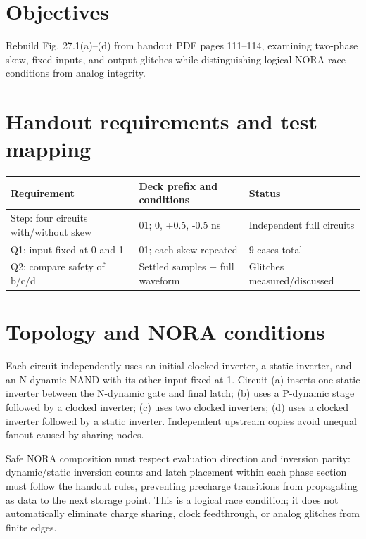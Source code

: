 \section{Objectives}

Rebuild Fig. 27.1(a)--(d) from handout PDF pages 111--114, examining two-phase skew, fixed inputs, and output glitches while distinguishing logical NORA race conditions from analog integrity.

\section{Handout requirements and test mapping}

\begin{center}
\small
\setlength{\tabcolsep}{4pt}
\begin{tabular}{p{.42\linewidth}p{.29\linewidth}p{.18\linewidth}}
\toprule
Requirement & Deck prefix and conditions & Status \\
\midrule
Step: four circuits with/without skew & 01; 0, +0.5, -0.5 ns & Independent full circuits \\
Q1: input fixed at 0 and 1 & 01; each skew repeated & 9 cases total \\
Q2: compare safety of b/c/d & Settled samples + full waveform & Glitches measured/discussed \\
\bottomrule
\end{tabular}
\end{center}

\section{Topology and NORA conditions}

Each circuit independently uses an initial clocked inverter, a static inverter, and an N-dynamic NAND with its other input fixed at 1. Circuit (a) inserts one static inverter between the N-dynamic gate and final latch; (b) uses a P-dynamic stage followed by a clocked inverter; (c) uses two clocked inverters; (d) uses a clocked inverter followed by a static inverter. Independent upstream copies avoid unequal fanout caused by sharing nodes.

Safe NORA composition must respect evaluation direction and inversion parity: dynamic/static inversion counts and latch placement within each phase section must follow the handout rules, preventing precharge transitions from propagating as data to the next storage point. This is a logical race condition; it does not automatically eliminate charge sharing, clock feedthrough, or analog glitches from finite edges.

